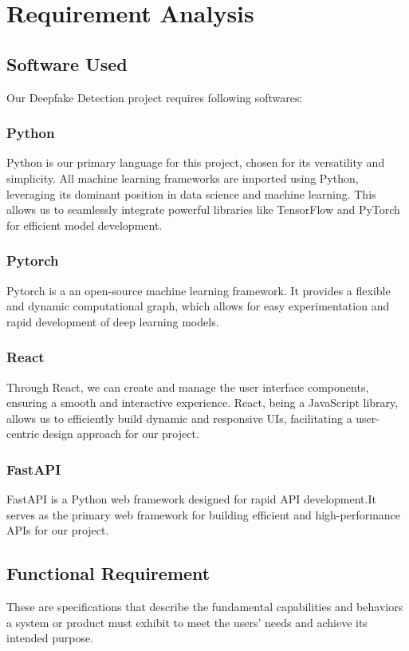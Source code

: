 \chapter{Requirement Analysis}
\section{Software Used}
    Our Deepfake Detection project requires following softwares:
    \subsection*{Python} 
    Python is our primary language for this project, chosen for its versatility and simplicity. All machine learning frameworks are imported using
    Python, leveraging its dominant position in data science and machine learning. This allows us to seamlessly integrate powerful libraries like TensorFlow and PyTorch for efficient model development.

    \subsection*{Pytorch}
    Pytorch is a an open-source machine learning framework. It provides a flexible and dynamic computational graph, which allows for easy experimentation and rapid development of deep learning models. 

    \subsection*{React}
    Through React, we can create and manage the user interface components, ensuring a smooth and interactive experience. React, being a JavaScript library, allows us to efficiently build dynamic and responsive UIs, facilitating a user-centric design approach for our project.

    \subsection*{FastAPI}
    FastAPI is a Python web framework designed for rapid API development.It serves as the primary web framework for building efficient and high-performance APIs for our project.
        
\newpage
\section{Functional Requirement}
    These are specifications that describe the fundamental capabilities and behaviors a system or product must exhibit to meet the users' needs and achieve its intended purpose. 

